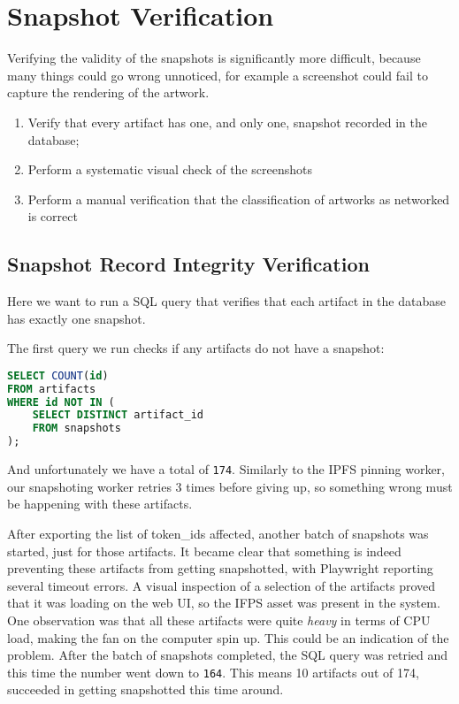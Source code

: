 \section{Snapshot Verification}

Verifying the validity of the snapshots is significantly more difficult, because many things could go wrong unnoticed, for example a screenshot could fail to capture the rendering of the artwork.

\begin{enumerate}
    \item Verify that every artifact has one, and only one, snapshot recorded in the database;
    \item Perform a systematic visual check of the screenshots
    \item Perform a manual verification that the classification of artworks as networked is correct
\end{enumerate}

\subsection{Snapshot Record Integrity Verification}

Here we want to run a SQL query that verifies that each artifact in the database has exactly one snapshot. 

The first query we run checks if any artifacts do not have a snapshot:

\begin{lstlisting}[language=SQL, caption={SQL - Check Missing Snapshots}, label={lst:sql-missing-snapshots}] 
SELECT COUNT(id)
FROM artifacts
WHERE id NOT IN (
    SELECT DISTINCT artifact_id
    FROM snapshots
);
\end{lstlisting}

And unfortunately we have a total of \texttt{174}. Similarly to the IPFS pinning worker, our snapshoting worker retries 3 times before giving up, so something wrong must be happening with these artifacts.

After exporting the list of token\_ids affected,  another batch of snapshots was started, just for those artifacts. It became clear that something is indeed preventing these artifacts from getting snapshotted, with Playwright reporting several timeout errors. A visual inspection of a selection of the artifacts proved that it was loading on the web UI, so the IFPS asset was present in the system. One observation was that all these artifacts were quite \emph{heavy} in terms of CPU load, making the fan on the computer spin up. This could be an indication of the problem. After the batch of snapshots completed, the SQL query was retried and this time the number went down to \texttt{164}. This means 10 artifacts out of 174, succeeded in getting snapshotted this time around.

